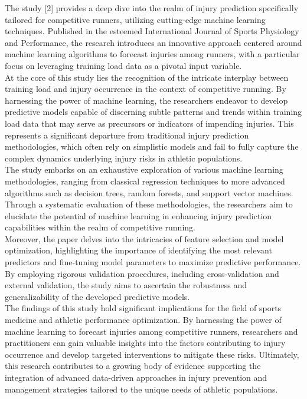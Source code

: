 \documentclass[12pt, English]{article}
\begin{document}
\begin{normalsize}
The study [2] provides a deep dive into the realm of injury prediction specifically tailored for competitive runners, utilizing cutting-edge machine learning techniques. Published in the esteemed International Journal of Sports Physiology and Performance, the research introduces an innovative approach centered around machine learning algorithms to forecast injuries among runners, with a particular focus on leveraging training load data as a pivotal input variable.\\
At the core of this study lies the recognition of the intricate interplay between training load and injury occurrence in the context of competitive running. By harnessing the power of machine learning, the researchers endeavor to develop predictive models capable of discerning subtle patterns and trends within training load data that may serve as precursors or indicators of impending injuries. This represents a significant departure from traditional injury prediction methodologies, which often rely on simplistic models and fail to fully capture the complex dynamics underlying injury risks in athletic populations.\\
The study embarks on an exhaustive exploration of various machine learning methodologies, ranging from classical regression techniques to more advanced algorithms such as decision trees, random forests, and support vector machines. Through a systematic evaluation of these methodologies, the researchers aim to elucidate the potential of machine learning in enhancing injury prediction capabilities within the realm of competitive running.\\
Moreover, the paper delves into the intricacies of feature selection and model optimization, highlighting the importance of identifying the most relevant predictors and fine-tuning model parameters to maximize predictive performance. By employing rigorous validation procedures, including cross-validation and external validation, the study aims to ascertain the robustness and generalizability of the developed predictive models.\\
The findings of this study hold significant implications for the field of sports medicine and athletic performance optimization. By harnessing the power of machine learning to forecast injuries among competitive runners, researchers and practitioners can gain valuable insights into the factors contributing to injury occurrence and develop targeted interventions to mitigate these risks. Ultimately, this research contributes to a growing body of evidence supporting the integration of advanced data-driven approaches in injury prevention and management strategies tailored to the unique needs of athletic populations.
\\


\end{normalsize}
\end{document}
